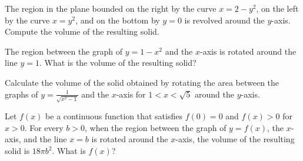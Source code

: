 \documentclass{ximera}
\begin{document}
\begin{question}
 The region in the plane bounded on the right by the curve $x = 2 - y^2$, on the left by the curve $x = y^2$, and on the bottom by $y = 0$ is revolved around the $y$-axis. Compute the volume of the resulting solid.
\begin{multipleChoice}
\end{multipleChoice}
\end{question}

\begin{question}%

The region between the graph of \(y = 1-x^2\) and the \(x\)-axis is rotated around the line \(y=1\). What is the volume of the resulting solid?
\begin{multiplechoice}
\choice{\(2 \pi\)}
\end{multiplechoice}

\end{question}


\begin{question}%

Calculate the volume of the solid obtained by rotating the area between the graphs of \(\displaystyle y = \frac{1}{\sqrt{x^2-1}}\) and the \(x\)-axis for \(1 < x < \sqrt{5}\) around the \(y\)-axis.
\begin{multiplechoice}
\choice{\(\pi\)}
\choice[correct]{\(4 \pi\)}
\choice{\(6 \pi\)}
\choice{\(8 \pi\)}
\choice{\(3 \pi\)}
\choice{\(2 \pi\)}
\end{multiplechoice}

\end{question}

\begin{question}%

Let \(f(x)\) be a continuous function that satisfies \(f(0) = 0\) and \(f(x) > 0\) for \(x > 0\). For every \(b > 0\), when the region between the graph of \(y = f(x)\), the \(x\)-axis, and the line \(x=b\) is rotated around the \(x\)-axis, the volume of the resulting solid is \(18 \pi b^2\). What is \(f(x)\)?
\begin{multiplechoice}
\end{multiplechoice}

\end{question}
\end{document}
